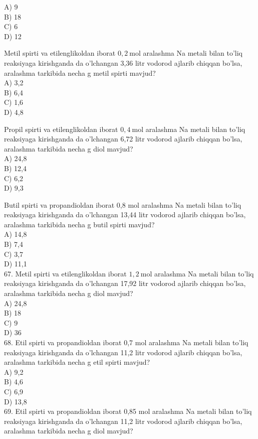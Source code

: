 A) 9\\
B) 18\\
C) 6\\
D) 12
  \item Metil spirti va etilenglikoldan iborat $0,2 \mathrm{~mol}$ aralashma Na metali bilan to'liq reaksiyaga kirishganda da o'lchangan 3,36 litr vodorod ajlarib chiqqan bo'lsa, aralashma tarkibida necha g metil spirti mavjud?\\
A) 3,2\\
B) 6,4\\
C) 1,6\\
D) 4,8
  \item Propil spirti va etilenglikoldan iborat $0,4 \mathrm{~mol}$ aralashma Na metali bilan to'liq reaksiyaga kirishganda da o'lchangan 6,72 litr vodorod ajlarib chiqqan bo'lsa, aralashma tarkibida necha g diol mavjud?\\
A) 24,8\\
B) 12,4\\
C) 6,2\\
D) 9,3
  \item Butil spirti va propandioldan iborat 0,8 mol aralashma Na metali bilan to'liq reaksiyaga kirishganda da o'lchangan 13,44 litr vodorod ajlarib chiqqan bo'lsa, aralashma tarkibida necha g butil spirti mavjud?\\
A) 14,8\\
B) 7,4\\
C) 3,7\\
D) 11,1\\
67. Metil spirti va etilenglikoldan iborat $1,2 \mathrm{~mol}$ aralashma Na metali bilan to'liq reaksiyaga kirishganda da o'lchangan 17,92 litr vodorod ajlarib chiqqan bo'lsa, aralashma tarkibida necha g diol mavjud?\\
A) 24,8\\
B) 18\\
C) 9\\
D) 36\\
68. Etil spirti va propandioldan iborat 0,7 mol aralashma Na metali bilan to'liq reaksiyaga kirishganda da o'lchangan 11,2 litr vodorod ajlarib chiqqan bo'lsa, aralashma tarkibida necha g etil spirti mavjud?\\
A) 9,2\\
B) 4,6\\
C) 6,9\\
D) 13,8\\
69. Etil spirti va propandioldan iborat 0,85 mol aralashma Na metali bilan to'liq reaksiyaga kirishganda da o'lchangan 11,2 litr vodorod ajlarib chiqqan bo'lsa, aralashma tarkibida necha g diol mavjud?\\
